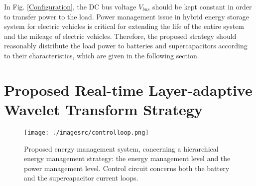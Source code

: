 \documentclass[energies,article,submit,moreauthors,pdftex,10pt,a4paper]{Definitions/mdpi}
\begin{document}


In Fig. \ref{Configuration}, the DC bus voltage ${V_{bus}}$ should be kept constant in order to transfer power to the load. 
Power management issue in hybrid energy storage system for electric vehicles is critical for extending the life of the entire system and the mileage of electric vehicles. 
Therefore, the proposed strategy should reasonably distribute the load power to batteries and supercapacitors according to their characteristics, which are given in the following section.
 
\section{Proposed Real-time Layer-adaptive Wavelet Transform Strategy }

\begin{figure*}[ht]
\centering
\texttt{[image: ./imagesrc/controlloop.png]}
\caption{ Proposed energy management system, concerning a hierarchical energy management strategy: the energy management level and the power management level. Control circuit concerns both the battery and the supercapacitor current loops.}
\label{controlloop}
\end{figure*}
\end{document}

